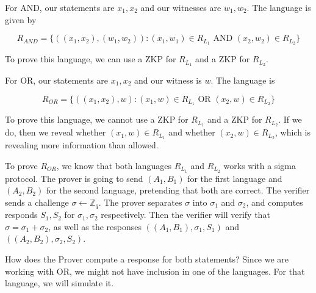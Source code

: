 For AND, our statements are $x_1, x_2$ and our witnesses are $w_1, w_2$. The language is given by

\[ R_{AND} = \{ ((x_1, x_2), (w_1, w_2)): (x_1, w_1) \in R_{L_1} \text{ AND } (x_2, w_2) \in R_{L_2}\}\]

To prove this language, we can use a ZKP for $R_{L_1}$ and a ZKP for $R_{L_2}$.

For OR, our statements are $x_1, x_2$ and our witness is $w$. The language is

\[ R_{OR} = \{ ((x_1, x_2), w): (x_1, w) \in R_{L_1} \text{ OR } (x_2, w) \in R_{L_2}\}\]

To prove this language, we cannot use a ZKP for $R_{L_1}$ and a ZKP for $R_{L_2}$. If we do, then we reveal whether $(x_1, w) \in R_{L_1}$ and whether $(x_2, w) \in R_{L_2}$, which is revealing more information than allowed.

To prove $R_{OR}$, we know that both languages $R_{L_1}$ and $R_{L_2}$ works with a sigma protocol. The prover is going to send $(A_1, B_1)$ for the first language and $(A_2, B_2)$ for the second language, pretending that both are correct. The verifier sends a challenge $\sigma \gets \mathbb{Z}_q$. The prover separates $\sigma$ into $\sigma_1$ and $\sigma_2$, and computes responds $S_1, S_2$ for $\sigma_1, \sigma_2$ respectively. Then the verifier will verify that $\sigma = \sigma_1 + \sigma_2$, as well as the responses $((A_1, B_1), \sigma_1, S_1)$ and $((A_2, B_2), \sigma_2, S_2)$.

How does the Prover compute a response for both statements? Since we are working with OR, we might not have inclusion in one of the languages. For that language, we will simulate it.